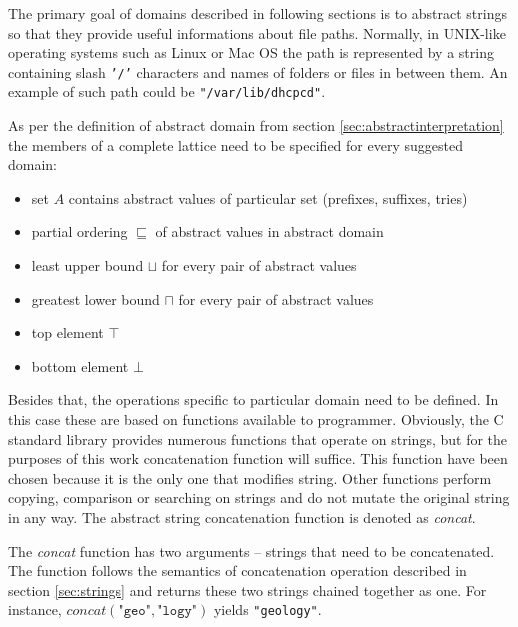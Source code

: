 \documentclass[12pt,final,oneside]{fithesis2}
\theoremstyle{definition}
\begin{document}
The primary goal of domains described in following sections is to
abstract strings so that they provide useful informations about file
paths. Normally, in UNIX-like operating systems such as Linux or Mac OS
the path is represented by a string containing slash \texttt{'/'} characters
and names of folders or files in between them. An example of such path could
be \texttt{"/var/lib/dhcpcd"}.

As per the definition of abstract domain from section
\ref{sec:abstractinterpretation} the members of a complete lattice need to be
specified for every suggested domain:

\begin{itemize}

\item set $A$ contains abstract values of particular set (prefixes,
suffixes, tries)

\item partial ordering $\sqsubseteq$ of abstract values in abstract domain

\item least upper bound $\sqcup$ for every pair of abstract values

\item greatest lower bound $\sqcap$ for every pair of abstract values

\item top element $\top$

\item bottom element $\bot$

\end{itemize}

Besides that, the operations specific to particular domain need to be
defined. In this case these are based on functions available to programmer.
Obviously, the C standard library provides numerous functions that operate
on strings, but for the purposes of this work concatenation function will
suffice. This function have been chosen because it is the only one that
modifies string. Other functions perform copying, comparison or searching
on strings and do not mutate the original string in any way. The abstract
string concatenation function is denoted as \textit{concat}.

The \textit{concat} function has two arguments -- strings that need to be
concatenated. The function follows the semantics of concatenation
operation described in section \ref{sec:strings} and returns these two
strings chained together as one. For instance,
$\textit{concat}(\texttt{"geo"}, \texttt{"logy"})$ yields \texttt{"geology"}.
\end{document}
